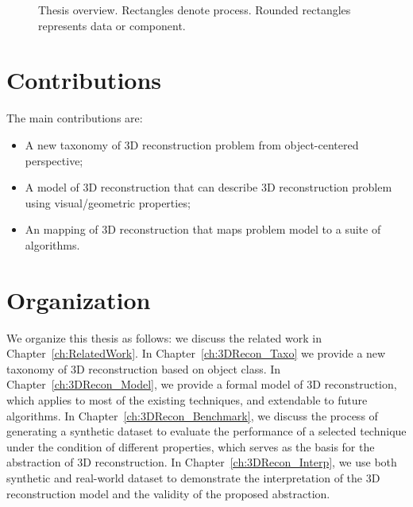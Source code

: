 \begin{figure}[ht]
\caption{Thesis overview. Rectangles denote process. Rounded rectangles represents data or component.}
\label{system_overview}
\end{figure}

\section{Contributions}
The main contributions are:
\begin{itemize}
\item A new taxonomy of 3D reconstruction problem from object-centered perspective;
\item A model of 3D reconstruction that can describe 3D reconstruction problem using visual/geometric properties;
\item An mapping of 3D reconstruction that maps problem model to a suite of algorithms.
\end{itemize}

\section{Organization}
We organize this thesis as follows: we discuss the related work in Chapter~\ref{ch:RelatedWork}. In Chapter~\ref{ch:3DRecon_Taxo} we provide a new taxonomy of 3D reconstruction based on object class. In Chapter~\ref{ch:3DRecon_Model}, we provide  a formal  model of 3D reconstruction, which applies to most of the existing techniques, and extendable to future algorithms. In Chapter~\ref{ch:3DRecon_Benchmark}, we discuss the process of generating a synthetic dataset to evaluate the performance of a selected technique under the condition of different properties, which serves as the basis for the abstraction of 3D reconstruction. In Chapter~\ref{ch:3DRecon_Interp}, we  use both synthetic and real-world dataset to demonstrate the interpretation of the 3D reconstruction model and the validity of the proposed abstraction.
